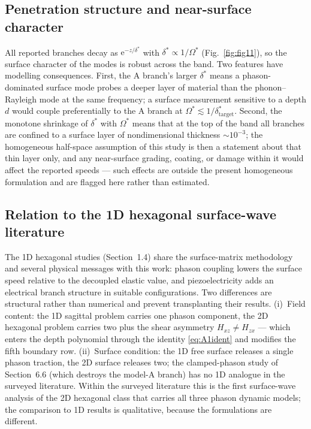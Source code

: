 \documentclass[11pt]{article}
\newcommand{\Om}{\Omega}
\begin{document}
\subsection{Penetration structure and near-surface character}

All reported branches decay as $\mathrm{e}^{-z/\delta^*}$ with $\delta^*\propto1/\Om^*$ (Fig.~\ref{fig:fig11}), so the surface character of the modes is robust across the band. Two features have modelling consequences. First, the A branch's larger $\delta^*$ means a phason-dominated surface mode probes a deeper layer of material than the phonon--Rayleigh mode at the same frequency; a surface measurement sensitive to a depth $d$ would couple preferentially to the A branch at $\Om^*\lesssim1/\delta^*_{\text{target}}$. Second, the monotone shrinkage of $\delta^*$ with $\Om^*$ means that at the top of the band all branches are confined to a surface layer of nondimensional thickness $\sim10^{-3}$; the homogeneous half-space assumption of this study is then a statement about that thin layer only, and any near-surface grading, coating, or damage within it would affect the reported speeds --- such effects are outside the present homogeneous formulation and are flagged here rather than estimated.

\subsection{Relation to the 1D hexagonal surface-wave literature}

The 1D hexagonal studies (Section~1.4) share the surface-matrix methodology and several physical messages with this work: phason coupling lowers the surface speed relative to the decoupled elastic value, and piezoelectricity adds an electrical branch structure in suitable configurations. Two differences are structural rather than numerical and prevent transplanting their results. (i)~Field content: the 1D sagittal problem carries one phason component, the 2D hexagonal problem carries two plus the shear asymmetry $H_{xz}\neq H_{zx}$ --- which enters the depth polynomial through the identity \eqref{eq:A1ident} and modifies the fifth boundary row. (ii)~Surface condition: the 1D free surface releases a single phason traction, the 2D surface releases two; the clamped-phason study of Section~6.6 (which destroys the model-A branch) has no 1D analogue in the surveyed literature. Within the surveyed literature this is the first surface-wave analysis of the 2D hexagonal class that carries all three phason dynamic models; the comparison to 1D results is qualitative, because the formulations are different.
\end{document}
